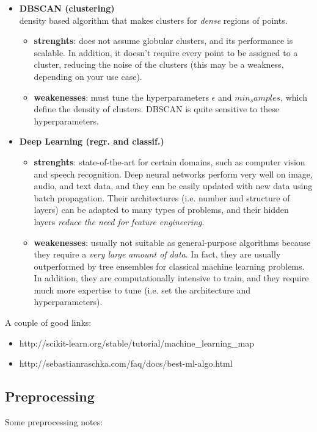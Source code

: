 \documentclass[11pt]{article}
\begin{document}
\begin{itemize}
\begin{itemize}
	\end{itemize}
	\item \textbf{DBSCAN (clustering)} \\
	density based algorithm that makes clusters for \textit{dense} regions of points.
	\begin{itemize}
		\item \textbf{strenghts}: does not assume globular clusters, and its performance is scalable. In addition, it doesn't require every point to be assigned to a cluster, reducing the noise of the clusters (this may be a weakness, depending on your use case).
		\item \textbf{weakenesses}:  must tune the hyperparameters $\epsilon$ and $min_samples$, which define the density of clusters. DBSCAN is quite sensitive to these hyperparameters.
	\end{itemize}
	\item \textbf{Deep Learning (regr. and classif.)}
	\begin{itemize}
		\item \textbf{strenghts}: state-of-the-art for certain domains, such as computer vision and speech recognition. Deep neural networks perform very well on image, audio, and text data, and they can be easily updated with new data using batch propagation. Their architectures (i.e. number and structure of layers) can be adapted to many types of problems, and their hidden layers \textit{reduce the need for feature engineering}.
		\item \textbf{weakenesses}:  usually not suitable as general-purpose algorithms because they require a \textit{very large amount of data}. In fact, they are usually outperformed by tree ensembles for classical machine learning problems. In addition, they are computationally intensive to train, and they require much more expertise to tune (i.e. set the architecture and hyperparameters).
	\end{itemize}
\end{itemize}

A couple of good links:
\begin{itemize}
	\item http://scikit-learn.org/stable/tutorial/machine\_learning\_map
	\item http://sebastianraschka.com/faq/docs/best-ml-algo.html
\end{itemize}

\subsection{Preprocessing}
Some preprocessing notes:
\end{document}
